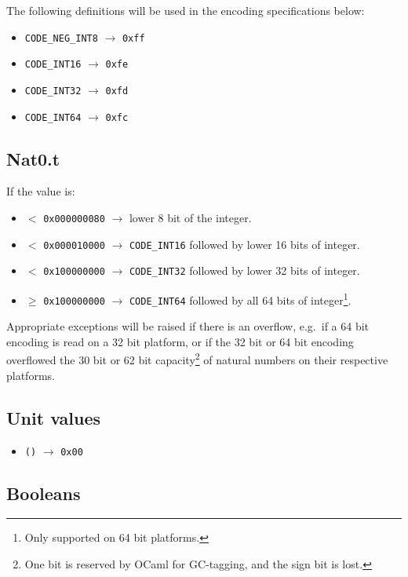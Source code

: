 \documentclass[12pt]{article}
\begin{document}
\noindent The following definitions will be used in the encoding specifications
below:

\begin{itemize}
\item \verb=CODE_NEG_INT8= $\rightarrow$ \verb=0xff=
\item \verb=CODE_INT16= $\rightarrow$ \verb=0xfe=
\item \verb=CODE_INT32= $\rightarrow$ \verb=0xfd=
\item \verb=CODE_INT64= $\rightarrow$ \verb=0xfc=
\end{itemize}

\subsection{Nat0.t}

If the value is:

\begin{itemize}
\item $<$ \verb=0x000000080= $\rightarrow$ lower 8 bit of the integer.
\item $<$ \verb=0x000010000= $\rightarrow$ \verb=CODE_INT16= followed by lower 16 bits of integer.
\item $<$ \verb=0x100000000= $\rightarrow$ \verb=CODE_INT32= followed by lower 32 bits of integer.
\item $\geq$ \verb=0x100000000= $\rightarrow$ \verb=CODE_INT64= followed by all 64 bits of integer\footnote{Only supported on 64 bit platforms.}.
\end{itemize}

Appropriate exceptions will be raised if there is an overflow, e.g.\ if
a 64 bit encoding is read on a 32 bit platform, or if the 32 bit or 64
bit encoding overflowed the 30 bit or 62 bit capacity\footnote{One bit is
reserved by OCaml for GC-tagging, and the sign bit is lost.} of natural
numbers on their respective platforms.

\subsection{Unit values}

\begin{itemize}
\item \verb=()= $\rightarrow$ \verb=0x00=
\end{itemize}

\subsection{Booleans}
\end{document}
